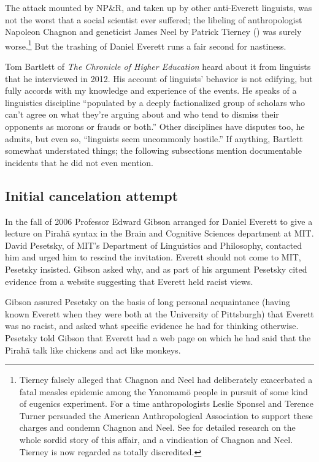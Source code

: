 \documentclass[output=paper,colorlinks,citecolor=brown
]{langscibook}
\begin{document}
The attack mounted by NP\&R, and taken up by other anti-Everett
linguists, was not the worst that a social scientist ever suffered;
the libeling of anthropologist Napoleon Chagnon and geneticist James
Neel by Patrick Tierney (\citeyear{Tierney00}) was surely worse.\footnote{%
   Tierney falsely alleged that Chagnon and Neel had deliberately
   exacerbated a fatal measles epidemic among the Yanomam{\"o} people
   in pursuit of some kind of eugenics experiment. For a time
   anthropologists Leslie Sponsel and Terence Turner persuaded the
   American Anthropological Association to support these charges and
   condemn Chagnon and Neel. See \citealt{Dreger11} for detailed
   research on the whole sordid story of this affair, and a vindication
   of Chagnon and Neel. Tierney is now regarded as totally discredited.}
But the trashing of Daniel Everett runs a fair second for nastiness.

Tom Bartlett of \textit{The Chronicle of Higher Education} heard
about it from linguists that he interviewed in 2012. His account of
linguists' behavior \citep{Bartlett12} is not edifying, but fully
accords with my knowledge and experience of the events. He speaks
of a linguistics discipline ``populated by a deeply factionalized
group of scholars who can't agree on what they're arguing about
and who tend to dismiss their opponents as morons or frauds or both.''
Other disciplines have disputes too, he admits, but even so,
``linguists seem uncommonly hostile.'' If anything, Bartlett somewhat
understated things; the following subsections mention documentable
incidents that he did not even mention.

\subsection{Initial cancelation attempt}\label{river}

In the fall of 2006 Professor Edward Gibson arranged for Daniel
Everett to give a lecture on Pirah{\~a} syntax in the Brain and
Cognitive Sciences department at MIT. David Pesetsky, of MIT's
Department of Linguistics and Philosophy, contacted him and
urged him to rescind the invitation. Everett should not come to
MIT, Pesetsky insisted. Gibson asked why, and as part of his argument
Pesetsky cited evidence from a website suggesting that Everett held
racist views.

Gibson assured Pesetsky on the basis of long personal acquaintance
(having known Everett when they were both at the University of
Pittsburgh) that Everett was no racist, and asked what specific
evidence he had for thinking otherwise. Pesetsky told Gibson that
Everett had a web page on which he had said that the Pirah{\~a}
talk like chickens and act like monkeys.
\end{document}
